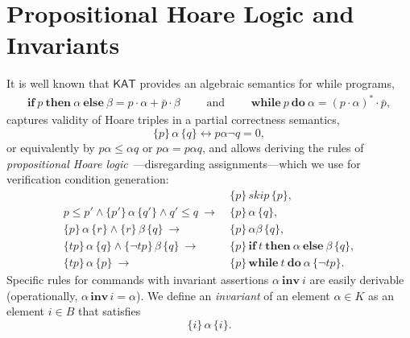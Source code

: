 \documentclass[envcountsame]{llncs}
\newcommand{\IF}[3]{\mathbf{if}\ #1\ \mathbf{then}\ #2\ \mathbf{else}\ #3}
\newcommand{\WHILE}[2]{\mathbf{while}\ #1\ \mathbf{do}\ #2}
\newcommand{\sskip}{\mathit{skip}}
\newcommand{\KAT}{\mathsf{KAT}}
\begin{document}

\section{Propositional Hoare Logic and Invariants}\label{sec:hl-invariants}

It is well known that $\KAT$ provides an algebraic semantics for while
programs,
\begin{align*}
  \IF{p}{\alpha}{\beta} = p\cdot \alpha + \bar p \cdot
  \beta\qquad\text{ and }\qquad
\WHILE{p}{\alpha} = (p\cdot \alpha)^\ast \cdot \bar p,
\end{align*}
captures validity of Hoare triples in
a partial correctness semantics,
\begin{equation*}
  \{p\}\, \alpha\, \{q\} \leftrightarrow p\alpha\neg q = 0,
\end{equation*}
or equivalently by $p\alpha\le \alpha q$ or $p\alpha = p\alpha q$, and
allows deriving the rules of \emph{propositional Hoare
  logic}~\cite{Kozen00}---disregarding assignments---which we use for
verification condition generation:
\begin{align}
  &\{p\}\, \sskip\, \{p\}, \label{eq:h-skip}\tag{h-skip}\\
  p\le p' \land \{p'\}\, \alpha\, \{q'\} \land q'\le q\ \rightarrow\ &
                                                                       \{p\}\,
                                                                       \alpha\,
                                                                       \{q\},\label{eq:h-cons}\tag{h-cons}\\
  \{p\}\, \alpha\, \{r\} \land \{r\}\, \beta\, \{q\}\ \rightarrow\
  &\{p\}\, \alpha\beta\, \{q\},\label{eq:h-seq}\tag{h-seq}\\
  \{tp\}\, \alpha\, \{q\}\land \{\neg tp\}\, \beta\, \{q\}\
  \rightarrow\ & \{p\}\, \IF{t}{\alpha}{\beta}\, \{q\},\label{eq:h-cond}\tag{h-cond}\\
  \{tp\}\, \alpha\, \{p\}\ \rightarrow\ & \{p\}\, \WHILE{t}{\alpha}\, \{\neg tp\}.\label{eq:h-while}\tag{h-while}
\end{align}
Specific rules for commands with invariant assertions
$\alpha\ \mathbf{inv}\ i$ are easily derivable (operationally,
$\alpha\, \mathbf{inv}\, i = \alpha$).  We define an \emph{invariant}
of an element $\alpha\in K$ as an element $i\in B$ that satisfies
\begin{equation*}
  \{i\}\, \alpha\, \{i\}.
\end{equation*}
\end{document}
